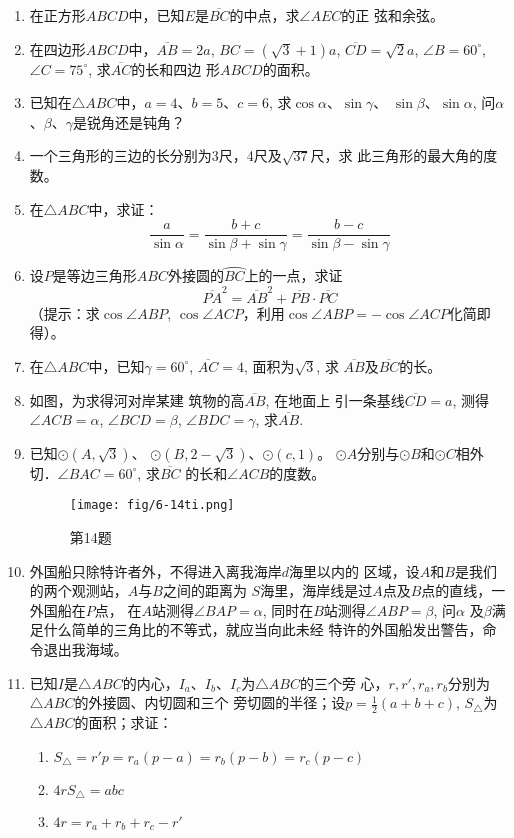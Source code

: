 \begin{enumerate}
\item 在正方形$ABCD$中，已知$E$是$\overline{BC}$的中点，求$\angle AEC$的正
弦和余弦。
\item 在四边形$ABCD$中，$\overline{AB}=2a$, $BC=(\sqrt{3}+1)a$, 
$\overline{CD}=\sqrt{2}a$, $\angle B=60^{\circ}$, $\angle C=75^{\circ}$, 求$\overline{AC}$的长和四边
形$ABCD$的面积。
\item 已知在$\triangle ABC$中，$a=4$、$b=5$、$c=6$, 求$\cos\alpha$、$\sin\gamma$、
$\sin\beta$、$\sin\alpha$, 问$\alpha$、$\beta$、$\gamma$是锐角还是钝角？
\item 一个三角形的三边的长分别为3尺，4尺及$\sqrt{37}$尺，求
此三角形的最大角的度数。
\item 在$\triangle ABC$中，求证：
\[\frac{a}{\sin\alpha}=\frac{b+c}{\sin\beta+\sin\gamma}=\frac{b-c}{\sin\beta-\sin\gamma}\]
\item 设$P$是等边三角形$ABC$外接圆的$\wideparen{BC}$上的一点，求证
\[\overline{PA}^2=\overline{AB}^2+\overline{PB}\cdot \overline{PC}\]
（提示：求$\cos\angle ABP$, $\cos\angle ACP$，利用$\cos\angle ABP=-\cos\angle ACP$化简即得）。
\item 在$\triangle ABC$中，已知$\gamma=60^{\circ}$, $\overline{AC}=4$, 面积为$\sqrt{3}$, 求
$\overline{AB}$及$\overline{BC}$的长。
\item 如图，为求得河对岸某建
筑物的高$\overline{AB}$, 在地面上
引一条基线$\overline{CD}=a$, 测得
$\angle ACB=\alpha$, $\angle BCD=\beta$, 
$\angle BDC=\gamma$, 求$\overline{AB}$.
\item 已知$\odot (A,\sqrt{3})$、
$\odot (B,2-\sqrt{3})$、$\odot (c,1)$。
$\odot A$分别与$\odot B$和$\odot C$相外
切．$\angle BAC=60^{\circ}$, 求$\overline{BC}$
的长和$\angle ACB$的度数。

\begin{figure}[htp]
    \centering
\texttt{[image: fig/6-14ti.png]}
    \caption*{第14题}
\end{figure}


\item 外国船只除特许者外，不得进入离我海岸$d$海里以内的
区域，设$A$和$B$是我们的两个观测站，$A$与$B$之间的距离为
$S$海里，海岸线是过$A$点及$B$点的直线，一外国船在$P$点，
在$A$站测得$\angle BAP=\alpha$, 同时在$B$站测得$\angle ABP=\beta$, 问$\alpha$
及$\beta$满足什么简单的三角比的不等式，就应当向此未经
特许的外国船发出警告，命令退出我海域。
\item 已知$I$是$\triangle ABC$的内心，$I_a$、$I_b$、$I_c$为$\triangle ABC$的三个旁
心，$r,r',r_a,r_b$分别为$\triangle ABC$的外接圆、内切圆和三个
旁切圆的半径；设$p=\frac{1}{2}(a+b+c)$, $S_{\triangle}$为$\triangle ABC$的面积；求证：
\begin{enumerate}
    \item $S_{\triangle}=r'p=r_a(p-a)=r_b(p-b)=r_c(p-c)$
    \item $4rS_{\triangle}=abc$
    \item $4r=r_a+r_b+r_c-r'$
\end{enumerate}


\end{enumerate}
